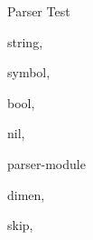 \documentclass{article}
\begin{document}
\begin{qstest}{Parser Test}{\@lispread}
\begin{qstest}{string}{\@lispread,\@tlabel@string}
    \end{qstest}
    \begin{qstest}{symbol}{\@lispread,\@tlabel@symbol}
      \parserTest{\symbol}{\@tlabel@symbol{\symbol}}
    \end{qstest}
    \begin{qstest}{bool}{\@lispread,\@tlabel@bool}
    \end{qstest}
    \begin{qstest}{nil}{\@lispread,\@tlabel@nil}
      \parserTest{()}{\@tlabel@nil{}}
    \end{qstest}
    \begin{qstest}{parser-module}{\@lispread}
      \def\@mod@read@dummy#1#2{\gdef#1{\@tlabel@testdummy{#2}}}
    \end{qstest}
    \begin{qstest}{dimen}{\@lispread,\@tlabel@dimen}
      \parserTest{!123.45pt}{\@tlabel@dimen{123.45pt}}
    \end{qstest}
    \begin{qstest}{skip}{\@lispread,\@tlabel@skip}
        {}
    \end{qstest}
  \end{qstest}
\end{document}
